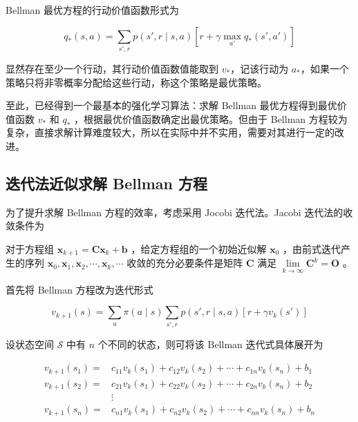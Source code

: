 Bellman 最优方程的行动价值函数形式为

\begin{equation}
    q_*(s,a) = \sum_{s',r}p(s',r \mid s,a)\left[r+\gamma \max_{a'}q_*(s',a') \right]
\end{equation}

\begin{Definition}
    显然存在至少一个行动，其行动价值函数值能取到 $v_*$，记该行动为 $a_*$，如果一个策略只将非零概率分配给这些行动，称这个策略是最优策略。
\end{Definition}

至此，已经得到一个最基本的强化学习算法：求解 Bellman 最优方程得到最优价值函数 $v_*$ 和 $q_*$ ，根据最优价值函数确定出最优策略。但由于 Bellman 方程较为复杂，直接求解计算难度较大，所以在实际中并不实用，需要对其进行一定的改进。

\subsection{迭代法近似求解 Bellman 方程}

为了提升求解 Bellman 方程的效率，考虑采用 Jocobi 迭代法\cite{2007numanalysis}。Jacobi 迭代法的收敛条件为

\begin{Theorem}\label{the:jacobi}
    对于方程组 $\boldsymbol{x}_{k+1} = \boldsymbol{Cx}_{k}+\boldsymbol{b}$ ，给定方程组的一个初始近似解 $\boldsymbol{x}_0$ ，由前式迭代产生的序列 $\boldsymbol{x}_0,\boldsymbol{x}_1,\boldsymbol{x}_2,\cdots,\boldsymbol{x}_k,\cdots$ 收敛的充分必要条件是矩阵 $\boldsymbol{C}$ 满足 $\lim\limits_{k \rightarrow \infty} \boldsymbol{C}^{k}=\boldsymbol{O}$ 。
\end{Theorem}

首先将 Bellman 方程改为迭代形式

\begin{equation}\label{eq:itebellman}
    v_{k+1}(s) = \sum_a\pi(a\mid s)\sum_{s',r}p(s',r \mid s,a)[r+\gamma v_k(s')]
\end{equation}

设状态空间 $\mathcal S$ 中有 $n$ 个不同的状态，则可将该 Bellman 迭代式具体展开为

\begin{equation}
    \begin{aligned}
        v_{k+1}(s_1)=&c_{11}v_k(s_1)+c_{12}v_k(s_2)+\cdots+c_{1n}v_k(s_n)+b_1\\
        v_{k+1}(s_2)= & c_{21}v_k(s_1)+c_{22}v_k(s_2)+\cdots+c_{2n}v_k(s_n)+b_2\\
        &\vdots\\
        v_{k+1}(s_n)= & c_{n1}v_k(s_1)+c_{n2}v_k(s_2)+\cdots+c_{nn}v_k(s_n)+b_n\\
        \end{aligned}
\end{equation}

